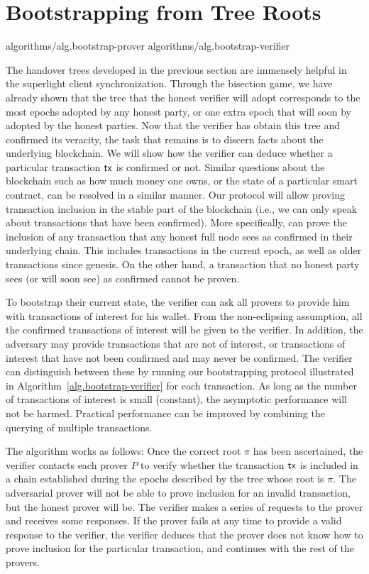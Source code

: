 \section{Bootstrapping from Tree Roots}

{algorithms/alg.bootstrap-prover}
{algorithms/alg.bootstrap-verifier}

The handover trees developed in the previous section are immensely helpful in the superlight
client synchronization. Through the bisection game, we have already shown that the tree that
the honest verifier will adopt corresponds to the most epochs adopted by any honest party, or
one extra epoch that will soon by adopted by the honest parties. Now that the verifier has
obtain this tree and confirmed its veracity, the task that remains is to discern facts about
the underlying blockchain. We will show how the verifier can deduce whether a particular transaction
$\mathsf{tx}$ is confirmed or not. Similar questions about the blockchain such as how much money one
owns, or the state of a particular smart contract, can be resolved in a similar manner.
Our protocol will allow proving transaction inclusion in the stable part of the blockchain
(i.e., we can only speak about transactions that have been confirmed). More specifically,
can prove the inclusion of any transaction that any honest full node sees
as confirmed in their underlying chain. This includes transactions in the current epoch,
as well as older transactions since genesis. On the other hand, a transaction that no
honest party sees (or will soon see) as confirmed cannot be proven.

To bootstrap their current state, the verifier can ask all provers to provide him with
transactions of interest for his wallet. From the non-eclipsing assumption, all the confirmed
transactions of interest will be given to the verifier. In addition, the adversary may provide
transactions that are not of interest, or transactions of interest that have not been confirmed
and may never be confirmed. The verifier can distinguish between these by running our bootstrapping
protocol illustrated in Algorithm~\ref{alg.bootstrap-verifier} for each transaction. As long as the number
of transactions of interest is small (constant), the asymptotic performance will not be harmed. 
Practical performance can be improved by combining the querying of multiple transactions.

The algorithm works as follows: Once the correct root $\pi$ has been ascertained, the verifier
contacts each prover $P$ to verify whether the transaction $\mathsf{tx}$ is included in a chain established
during the epochs described by the tree whose root is $\pi$. The adversarial prover will not be
able to prove inclusion for an invalid transaction, but the honest prover will be.
The verifier makes a series of requests to the prover and receives some responses.
If the prover fails at any time to provide a valid
response to the verifier, the verifier deduces that the prover does not know how to prove inclusion
for the particular transaction, and continues with the rest of the provers.

